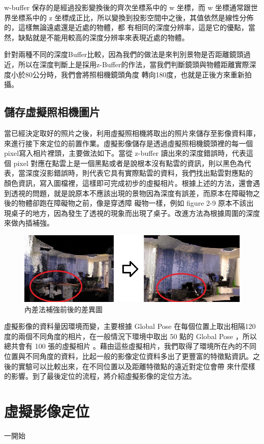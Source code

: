     w-buffer 保存的是經過投影變換後的齊次坐標系中的 w 坐標，而 w 坐標通常跟世界坐標系中的 z 坐標成正比，所以變換到投影空間中之後，其值依然是線性分佈的，這樣無論遠處還是近處的物體，都
    有相同的深度分辨率，這是它的優點，當然，缺點就是不能用較高的深度分辨率來表現近處的物體。
    
    針對兩種不同的深度Buffer比較，因為我們的做法是來判別景物是否距離鏡頭過近，所以在深度判斷上是採用z-Buffer的作法，當我們判斷鏡頭與物體距離實際深度小於80公分時，我們會將照相機鏡頭角度
    轉向180度，也就是正後方來重新拍攝。
    

\subsection{儲存虛擬照相機圖片}
%
	當已經決定取好的照片之後，利用虛擬照相機將取出的照片來儲存至影像資料庫，來進行接下來定位的前置作業。虛擬影像儲存是透過虛擬照相機鏡頭裡的每一個pixel寫入相片裡頭，主要做法如下。當從 
	z-buffer 讀出來的深度錯誤時，代表這個 pixel 對應在點雲上是一個黑點或者是說根本沒有點雲的資訊，則以黑色為代表，當深度沒影錯誤時，則代表它具有實際點雲的資料，我們找出點雲對應點的
	顏色資訊，寫入圖檔裡，這樣即可完成初步的虛擬相片。根據上述的方法，還會遇到透視的問題，就是說原本不應該出現的景物因為深度有誤差，而原本在障礙物之後的物體卻跑在障礙物之前，像是穿透障
	礙物一樣，例如 figure 2-9 原本不該出現桌子的地方，因為發生了透視的現象而出現了桌子。改進方法為根據周圍的深度來做內插補強。
	
	\begin{figure}
	\begin{center}
	  \includegraphics[width=1.0\textwidth]{figures/Depth_Interpolation.jpg}
	  \caption{內差法補強前後的差異圖}
	  \label{fig:interpolation}
	\end{center}
	\end{figure}	
	
	虛擬影像的資料量因環境而變，主要根據 Global Pose 在每個位置上取出相隔120度的兩個不同角度的相片，在一般情況下環境中取出 50 點的 Global Pose ，所以總共會有 100 張的虛擬相片
	。藉由這些虛擬相片，我們取得了環境所在內的不同位置與不同角度的資料，比起一般的影像定位資料多出了更豐富的特徵點資訊。之後的實驗可以比較出來，在不同位置以及距離特徵點的遠近對定位會帶
	來什麼樣的影響。到了最後定位的流程，將介紹虛擬影像的定位方法。

\section{虛擬影像定位}

%
	

	一開始





